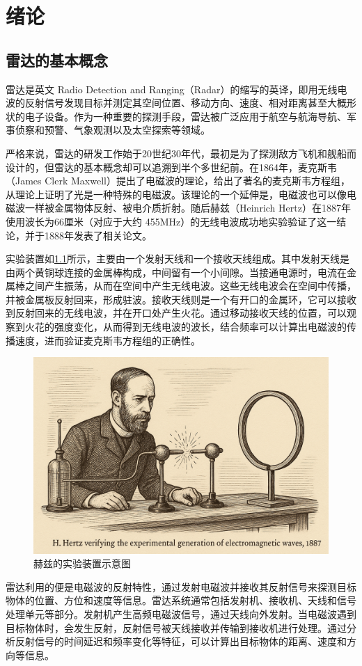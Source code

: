 \chapter{绪论}
\label{chp1}

\section{雷达的基本概念}
雷达是英文 Radio Detection and Ranging（Radar）的缩写的英译，即用无线电波的反射信号发现目标并测定其空间位置、移动方向、速度、相对距离甚至大概形状的电子设备。作为一种重要的探测手段，雷达被广泛应用于航空与航海导航、军事侦察和预警、气象观测以及太空探索等领域。

严格来说，雷达的研发工作始于20世纪30年代，最初是为了探测敌方飞机和舰船而设计的，但雷达的基本概念却可以追溯到半个多世纪前。在1864年，麦克斯韦（James Clerk Maxwell）提出了电磁波的理论，给出了著名的麦克斯韦方程组，从理论上证明了光是一种特殊的电磁波。该理论的一个延伸是，电磁波也可以像电磁波一样被金属物体反射、被电介质折射。随后赫兹（Heinrich Hertz）在1887年使用波长为66厘米（对应于大约 455MHz）的无线电波成功地实验验证了这一结论，并于1888年发表了相关论文。

实验装置如\cref{fig_chp1_hertz}所示，主要由一个发射天线和一个接收天线组成。其中发射天线是由两个黄铜球连接的金属棒构成，中间留有一个小间隙。当接通电源时，电流在金属棒之间产生振荡，从而在空间中产生无线电波。这些无线电波会在空间中传播，并被金属板反射回来，形成驻波。接收天线则是一个有开口的金属环，它可以接收到反射回来的无线电波，并在开口处产生火花。通过移动接收天线的位置，可以观察到火花的强度变化，从而得到无线电波的波长，结合频率可以计算出电磁波的传播速度，进而验证麦克斯韦方程组的正确性。

\begin{figure}[htb!]
    \centering
    \includegraphics[width=.6\textwidth]{./img/intro/hertz_experiment.png}
    \caption{赫兹的实验装置示意图}
    \label{fig_chp1_hertz}
\end{figure}

雷达利用的便是电磁波的反射特性，通过发射电磁波并接收其反射信号来探测目标物体的位置、方位和速度等信息。雷达系统通常包括发射机、接收机、天线和信号处理单元等部分。发射机产生高频电磁波信号，通过天线向外发射。当电磁波遇到目标物体时，会发生反射，反射信号被天线接收并传输到接收机进行处理。通过分析反射信号的时间延迟和频率变化等特征，可以计算出目标物体的距离、速度和方向等信息。


